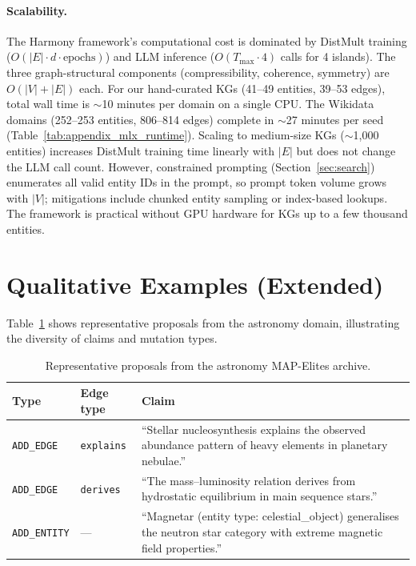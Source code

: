 \paragraph{Scalability.}
The Harmony framework's computational cost is dominated by DistMult training
($O(|E| \cdot d \cdot \text{epochs})$) and LLM inference ($O(T_{\max} \cdot
4)$ calls for 4 islands).  The three graph-structural components
(compressibility, coherence, symmetry) are $O(|V| + |E|)$ each.  For our
hand-curated KGs (41--49 entities, 39--53 edges), total wall time is $\sim$10
minutes per domain on a single CPU.  The Wikidata domains (252--253 entities,
806--814 edges) complete in $\sim$27 minutes per seed
(Table~\ref{tab:appendix_mlx_runtime}).
Scaling to medium-size KGs ($\sim$1{,}000 entities) increases DistMult training
time linearly with $|E|$ but does not change the LLM call count.  However,
constrained prompting (Section~\ref{sec:search}) enumerates all valid entity
IDs in the prompt, so prompt token volume grows with $|V|$; mitigations include
chunked entity sampling or index-based lookups.
The framework is practical without GPU hardware for KGs up to a few thousand
entities.

\section{Qualitative Examples (Extended)}\label{app:examples-extended}

Table~\ref{tab:examples} shows representative proposals from the astronomy
domain, illustrating the diversity of claims and mutation types.

\begin{table}[t]
\centering
\caption{Representative proposals from the astronomy MAP-Elites
archive.}\label{tab:examples}
\small
\begin{tabular}{p{2cm}p{2cm}p{6.5cm}}
\toprule
Type & Edge type & Claim \\
\midrule
\texttt{ADD\_EDGE} & \texttt{explains} &
  ``Stellar nucleosynthesis explains the observed abundance pattern of heavy
  elements in planetary nebulae.'' \\
\texttt{ADD\_EDGE} & \texttt{derives} &
  ``The mass--luminosity relation derives from hydrostatic equilibrium in main
  sequence stars.'' \\
\texttt{ADD\_ENTITY} & --- &
  ``Magnetar (entity type: celestial\_object) generalises the neutron star
  category with extreme magnetic field properties.'' \\
\bottomrule
\end{tabular}
\end{table}
